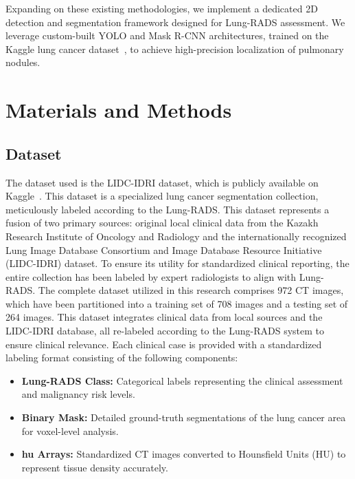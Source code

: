 \documentclass[conference]{IEEEtran}
\begin{document}
Expanding on these existing methodologies, we implement a dedicated 2D detection and segmentation framework designed for Lung-RADS assessment. We leverage custom-built YOLO and Mask R-CNN architectures, trained on the Kaggle lung cancer dataset~\cite{Armato2015}, to achieve high-precision localization of pulmonary nodules.

\section{Materials and Methods}
\subsection{Dataset}
The dataset used is the LIDC-IDRI dataset, which is publicly available on Kaggle~\cite{Armato2015}. This dataset is a specialized lung cancer segmentation collection, meticulously labeled according to the Lung-RADS. This dataset represents a fusion of two primary sources: original local clinical data from the Kazakh Research Institute of Oncology and Radiology and the internationally recognized Lung Image Database Consortium and Image Database Resource Initiative (LIDC-IDRI) dataset. To ensure its utility for standardized clinical reporting, the entire collection has been labeled by expert radiologists to align with Lung-RADS.
The complete dataset utilized in this research comprises 972 CT images, which have been partitioned into a training set of 708 images and a testing set of 264 images. This dataset integrates clinical data from local sources and the LIDC-IDRI database, all re-labeled according to the Lung-RADS system to ensure clinical relevance. Each clinical case is provided with a standardized labeling format consisting of the following components:

\begin{itemize}
    \item \textbf{Lung-RADS Class:} Categorical labels representing the clinical assessment and malignancy risk levels.
    \item \textbf{Binary Mask:} Detailed ground-truth segmentations of the lung cancer area for voxel-level analysis.
    \item \textbf{hu Arrays:} Standardized CT images converted to Hounsfield Units (HU) to represent tissue density accurately.
\end{itemize}
\end{document}
